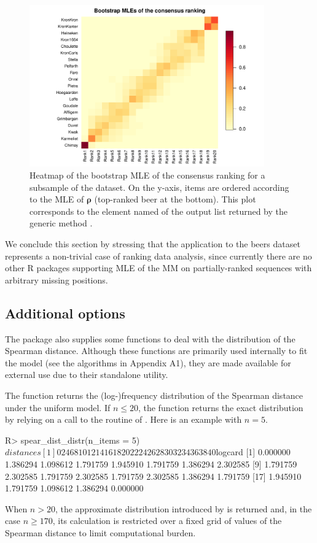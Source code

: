 \begin{figure}[t]
     \centering
     \includegraphics[scale=0.7,width=0.9\textwidth]{figures/RJ2025_paper_heat.pdf}
      \caption{Heatmap of the bootstrap MLE of the consensus ranking for a subsample of the  dataset. On the y-axis, items are ordered according to the MLE of $\bm\rho$ (top-ranked beer at the bottom). This plot corresponds to the element named  of the output list returned by the generic method .}
     \label{fig:heat_beers}
\end{figure}
%
We conclude this section by stressing that the application to the beers dataset represents a non-trivial case of ranking data analysis, since currently there are no other \textsf{R} packages supporting MLE of the MM on partially-ranked sequences with arbitrary missing positions.



\subsection{Additional options}

The  package also supplies some functions to deal with the distribution of the Spearman distance. Although these functions are primarily used internally to fit the model (see the algorithms in Appendix A1), they are made available for external use due to their standalone utility. 


The function  returns the (log-)frequency distribution of the Spearman distance under the uniform model. If $n\leq 20$, the function returns the exact distribution by relying on a call to the  routine of . Here is an example with $n=5$.
\begin{example}
R> spear_dist_distr(n_items = 5)
$distances
 [1]  0  2  4  6  8 10 12 14 16 18 20 22 24 26 28 30 32 34 36 38 40
$logcard
 [1] 0.000000 1.386294 1.098612 1.791759 1.945910 1.791759 1.386294 2.302585
 [9] 1.791759 2.302585 1.791759 2.302585 1.791759 2.302585 1.386294 1.791759
[17] 1.945910 1.791759 1.098612 1.386294 0.000000
\end{example}
When $n> 20$, the approximate distribution introduced by \cite{crispino23efficient} is returned and, in the case $n\geq 170$, its calculation is restricted over a fixed grid of values of the Spearman distance to limit computational burden.

